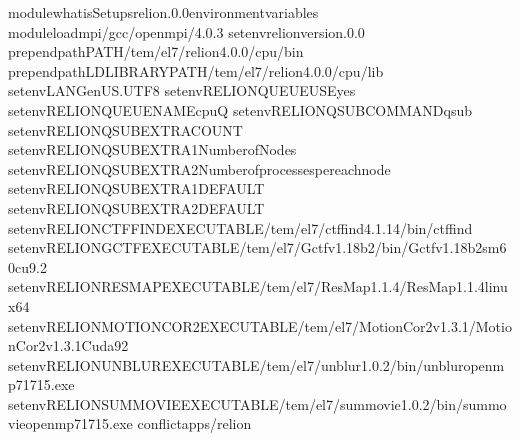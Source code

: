 \documentclass[a4paper,11pt,english]{sphinxmanual}
\begin{document}
\begin{sphinxVerbatim}[commandchars=\\\{\}]
module\PYGZhy{}whatisSetupsrelion.0.0environmentvariables
moduleloadmpi/gcc/openmpi/4.0.3
setenvrelion\PYGZus{}version.0.0
prepend\PYGZhy{}pathPATH/tem/el7/relion\PYGZhy{}4.0.0/cpu/bin
prepend\PYGZhy{}pathLD\PYGZus{}LIBRARY\PYGZus{}PATH/tem/el7/relion\PYGZhy{}4.0.0/cpu/lib
setenvLANGen\PYGZus{}US.UTF\PYGZhy{}8
setenvRELION\PYGZus{}QUEUE\PYGZus{}USEyes
setenvRELION\PYGZus{}QUEUE\PYGZus{}NAMEcpuQ
setenvRELION\PYGZus{}QSUB\PYGZus{}COMMANDqsub
setenvRELION\PYGZus{}QSUB\PYGZus{}EXTRA\PYGZus{}COUNT
setenvRELION\PYGZus{}QSUB\PYGZus{}EXTRA1NumberofNodes
setenvRELION\PYGZus{}QSUB\PYGZus{}EXTRA2Numberofprocessespereachnode
setenvRELION\PYGZus{}QSUB\PYGZus{}EXTRA1\PYGZus{}DEFAULT
setenvRELION\PYGZus{}QSUB\PYGZus{}EXTRA2\PYGZus{}DEFAULT
setenvRELION\PYGZus{}CTFFIND\PYGZus{}EXECUTABLE/tem/el7/ctffind\PYGZhy{}4.1.14/bin/ctffind
setenvRELION\PYGZus{}GCTF\PYGZus{}EXECUTABLE/tem/el7/Gctf\PYGZus{}v1.18\PYGZus{}b2/bin/Gctf\PYGZus{}v1.18\PYGZus{}b2\PYGZus{}sm60\PYGZus{}cu9.2
setenvRELION\PYGZus{}RESMAP\PYGZus{}EXECUTABLE/tem/el7/ResMap\PYGZhy{}1.1.4/ResMap\PYGZhy{}1.1.4\PYGZhy{}linux64
setenvRELION\PYGZus{}MOTIONCOR2\PYGZus{}EXECUTABLE/tem/el7/MotionCor2\PYGZus{}v1.3.1/MotionCor2\PYGZus{}v1.3.1\PYGZhy{}Cuda92
setenvRELION\PYGZus{}UNBLUR\PYGZus{}EXECUTABLE/tem/el7/unblur\PYGZus{}1.0.2/bin/unblur\PYGZus{}openmp\PYGZus{}7\PYGZus{}17\PYGZus{}15.exe
setenvRELION\PYGZus{}SUMMOVIE\PYGZus{}EXECUTABLE/tem/el7/summovie\PYGZus{}1.0.2/bin/sum\PYGZus{}movie\PYGZus{}openmp\PYGZus{}7\PYGZus{}17\PYGZus{}15.exe
conflictapps/relion
\PYGZhy{}\PYGZhy{}\PYGZhy{}\PYGZhy{}\PYGZhy{}\PYGZhy{}\PYGZhy{}\PYGZhy{}\PYGZhy{}\PYGZhy{}\PYGZhy{}\PYGZhy{}\PYGZhy{}\PYGZhy{}\PYGZhy{}\PYGZhy{}\PYGZhy{}\PYGZhy{}\PYGZhy{}\PYGZhy{}\PYGZhy{}\PYGZhy{}\PYGZhy{}\PYGZhy{}\PYGZhy{}\PYGZhy{}\PYGZhy{}\PYGZhy{}\PYGZhy{}\PYGZhy{}\PYGZhy{}\PYGZhy{}\PYGZhy{}\PYGZhy{}\PYGZhy{}\PYGZhy{}\PYGZhy{}\PYGZhy{}\PYGZhy{}\PYGZhy{}\PYGZhy{}\PYGZhy{}\PYGZhy{}\PYGZhy{}\PYGZhy{}\PYGZhy{}\PYGZhy{}\PYGZhy{}\PYGZhy{}\PYGZhy{}\PYGZhy{}\PYGZhy{}\PYGZhy{}\PYGZhy{}\PYGZhy{}\PYGZhy{}\PYGZhy{}\PYGZhy{}\PYGZhy{}\PYGZhy{}\PYGZhy{}\PYGZhy{}\PYGZhy{}\PYGZhy{}\PYGZhy{}\PYGZhy{}\PYGZhy{}
\end{sphinxVerbatim}
\end{document}
